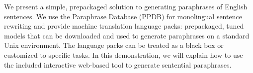 We present a simple, prepackaged solution to generating paraphrases of English sentences. We use the Paraphrase Database (PPDB) for monolingual sentence rewriting and provide machine translation language packs: prepackaged, tuned models that can be downloaded and used to generate paraphrases on a standard Unix environment. The language packs can be treated as a black box or customized to specific tasks. In this demonstration, we will explain how to use the included interactive web-based tool to generate sentential paraphrases.
